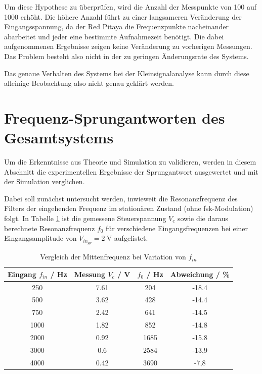 \documentclass[../main_config.tex]{subfiles}
\begin{document}
Um diese Hypothese zu überprüfen, wird die Anzahl der Messpunkte von \num{100} auf \num{1000} erhöht. Die höhere Anzahl führt zu einer langsameren Veränderung der Eingangsspannung, da der Red Pitaya die Frequenzpunkte nacheinander abarbeitet und jeder eine bestimmte Aufnahmezeit benötigt. Die dabei aufgenommenen Ergebnisse zeigen keine Veränderung zu vorherigen Messungen. Das Problem besteht also nicht in der zu geringen Änderungsrate des Systems. \par
\medskip

Das genaue Verhalten des Systems bei der Kleinsignalanalyse kann durch diese alleinige Beobachtung also nicht genau geklärt werden. \par
\medskip



\section{Frequenz-Sprungantworten des Gesamtsystems}
Um die Erkenntnisse aus Theorie und Simulation zu validieren, werden in diesem Abschnitt die experimentellen Ergebnisse der Sprungantwort ausgewertet und mit der Simulation verglichen.\par
\medskip

Dabei soll zunächst untersucht werden, inwieweit die Resonanzfrequenz des Filters der eingehenden Frequenz im stationären Zustand (ohne \gls{fsk}-Modulation) folgt. In Tabelle \ref{tab:ausw_mess_mfreq2} ist die gemessene Steuerspannung $V_c$ sowie die daraus berechnete Resonanzfrequenz $f_0$ für verschiedene Eingangsfrequenzen bei einer Eingangsamplitude von $V_{in_{pp}} = \SI{2}{\volt}$ aufgelistet.\par
\medskip

\begin{table}[h]
    \centering
    \begin{tabular}{c|c|c|c}
        \textbf{Eingang $f_{in}$ / \si{\hertz}} & \textbf{Messung $V_c$ / \si{\volt}} & \textbf{$f_0$ / \si{\hertz}} & \textbf{Abweichung / \%}  \\ \hline
        250 & 7.61 & 204 & -18.4 \\
        500 & 3.62 & 428 & -14.4 \\
        750 & 2.42 & 641 & -14.5 \\
        1000 & 1.82 & 852 & -14.8 \\
        2000 & 0.92 & 1685 & -15.8 \\
        3000 & 0.6 & 2584 & -13,9 \\
        4000 & 0.42 & 3690 & -7,8 \\
    \end{tabular}
    \caption{Vergleich der Mittenfrequenz bei Variation von $f_{in}$}
    \label{tab:ausw_mess_mfreq2}
\end{table}
\end{document}
